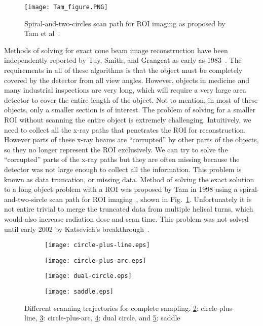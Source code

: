\begin{figure}[h]
\texttt{[image: Tam\_figure.PNG]}
\caption{Spiral-and-two-circles scan path for ROI imaging as proposed by Tam et al~\citep{Tam1998}.}
\label{fig:tam_circle}
\end{figure}

Methods of solving for exact cone beam image reconstruction have been independently reported by Tuy, Smith, and Grangeat as early as 1983~\citep{Tuy1983, Smith1985, Grangeat1991}.  The requirements in all of these algorithms is that the object must be completely covered by the detector from all view angles.  However, objects in medicine and many industrial inspections are very long, which will require a very large area detector to cover the entire length of the object.  Not to mention, in most of these objects, only a smaller section is of interest.  The problem of solving for a smaller ROI without scanning the entire object is extremely challenging.  Intuitively, we need to collect all the x-ray paths that penetrates the ROI for reconstruction.  However parts of these x-ray beams are ``corrupted'' by other parts of the objects, so they no longer represent the ROI exclusively.  We can try to solve the ``corrupted'' parts of the x-ray paths but they are often missing because the detector was not large enough to collect all the information.  This problem is known as data truncation, or missing data.  Method of solving the exact solution to a long object problem with a ROI was proposed by Tam in 1998 using a spiral-and-two-sircle scan path for ROI imaging~\citep{Tam1998}, shown in Fig.~\ref{fig:tam_circle}.  Unfortunately it is not entire trivial to merge the truncated data from multiple helical turns,  which would also increase radiation dose and scan time.  This problem was not solved until early 2002 by Katsevich's breakthrough~\citep{Katsevich2002SIAM, Katsevich2003, Katsevich2004}.

\begin{figure}[h]
	\begin{subfigure}[b]{0.2\linewidth}
		\texttt{[image: circle-plus-line.eps]}
		\caption{}
		\label{fig:circle-line}
	\end{subfigure}
	\begin{subfigure}[b]{0.2\linewidth}
		\texttt{[image: circle-plus-arc.eps]}
		\caption{}
		\label{fig:circle-arc}
	\end{subfigure}
	\begin{subfigure}[b]{0.2\linewidth}
		\texttt{[image: dual-circle.eps]}
		\caption{}
		\label{fig:dual-circle}
	\end{subfigure}
	\begin{subfigure}[b]{0.2\linewidth}
		\texttt{[image: saddle.eps]}
		\caption{}
		\label{fig:saddle}
	\end{subfigure}
\caption{Different scanning trajectories for complete sampling. \ref{fig:circle-line}: circle-plus-line, \ref{fig:circle-arc}: circle-plus-arc, \ref{fig:dual-circle}: dual circle, and \ref{fig:saddle}: saddle}
\label{fig:scanning_trajectories}
\end{figure}

